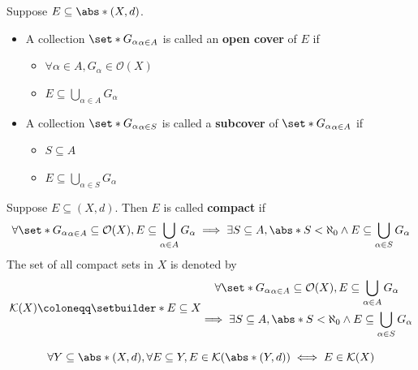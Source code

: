\begin{definition} \label{an1:def:open-cover}
  Suppose $E \subseteq \abs*{(X, d)}$.
  \begin{itemize}
    \item A collection $\set*{G_{\alpha}}_{\alpha \in A}$ is called an \textbf{open cover} of $E$ if
          \begin{itemize}
            \item $\forall \alpha \in A, G_{\alpha} \in \mathcal{O}(X)$
            \item $E \subseteq \bigcup_{\alpha \in A} G_{\alpha}$
          \end{itemize}
    \item A collection $\set*{G_{\alpha}}_{\alpha \in S}$ is called
          a \textbf{subcover} of $\set*{G_{\alpha}}_{\alpha \in A}$ if
          \begin{itemize}
            \item $S \subseteq A$
            \item $E \subseteq \bigcup_{\alpha \in S} G_{\alpha}$
          \end{itemize}
  \end{itemize}
\end{definition}

\begin{definition} \label{an1:def:compact}
  Suppose $E \subseteq (X, d)$. Then $E$ is called \textbf{compact} if
  \[
    \forall \set*{G_{\alpha}}_{\alpha \in A} \subseteq \mathcal{O}(X),
    E \subseteq \bigcup_{\alpha \in A} G_{\alpha} \implies \exists S \subseteq A,
    \abs*{S} < \aleph_{0} \land E \subseteq \bigcup_{\alpha \in S} G_{\alpha}
  \]
  The set of all compact sets in $X$ is denoted by
  \[
    \mathcal{K}(X) \coloneqq \setbuilder*{E \subseteq X}{
      \begin{gathered}
        \forall \set*{G_{\alpha}}_{\alpha \in A} \subseteq \mathcal{O}(X),
        E \subseteq \bigcup_{\alpha \in A} G_{\alpha} \\
        \implies \exists S \subseteq A, \abs*{S} < \aleph_{0} \land E \subseteq \bigcup_{\alpha \in S} G_{\alpha}
      \end{gathered}
    }
  \]
\end{definition}

\begin{theorem} \label{an1:thm:compactness-preserved-under-subspace}
  \[
    \forall Y \subseteq \abs*{(X, d)}, \forall E \subseteq Y,
    E \in \mathcal{K}(\abs*{(Y, d)}) \iff E \in \mathcal{K}(X)
  \]
\end{theorem}

